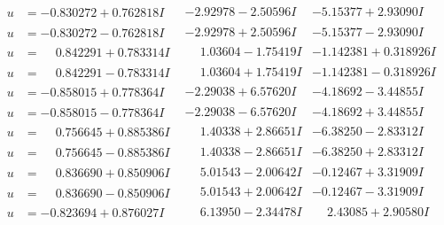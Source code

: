 \documentclass[1p]{elsarticle_modified}
\theoremstyle{definition}
\begin{document}
$$\begin{array}{c|c|c}
\begin{aligned}
u &= -0.830272 + 0.762818 I\end{aligned}
 & -2.92978 - 2.50596 I & -5.15377 + 2.93090 I \\ \hline\begin{aligned}
u &= -0.830272 - 0.762818 I\end{aligned}
 & -2.92978 + 2.50596 I & -5.15377 - 2.93090 I \\ \hline\begin{aligned}
u &= \phantom{-}0.842291 + 0.783314 I\end{aligned}
 & \phantom{-}1.03604 - 1.75419 I & -1.142381 + 0.318926 I \\ \hline\begin{aligned}
u &= \phantom{-}0.842291 - 0.783314 I\end{aligned}
 & \phantom{-}1.03604 + 1.75419 I & -1.142381 - 0.318926 I \\ \hline\begin{aligned}
u &= -0.858015 + 0.778364 I\end{aligned}
 & -2.29038 + 6.57620 I & -4.18692 - 3.44855 I \\ \hline\begin{aligned}
u &= -0.858015 - 0.778364 I\end{aligned}
 & -2.29038 - 6.57620 I & -4.18692 + 3.44855 I \\ \hline\begin{aligned}
u &= \phantom{-}0.756645 + 0.885386 I\end{aligned}
 & \phantom{-}1.40338 + 2.86651 I & -6.38250 - 2.83312 I \\ \hline\begin{aligned}
u &= \phantom{-}0.756645 - 0.885386 I\end{aligned}
 & \phantom{-}1.40338 - 2.86651 I & -6.38250 + 2.83312 I \\ \hline\begin{aligned}
u &= \phantom{-}0.836690 + 0.850906 I\end{aligned}
 & \phantom{-}5.01543 - 2.00642 I & -0.12467 + 3.31909 I \\ \hline\begin{aligned}
u &= \phantom{-}0.836690 - 0.850906 I\end{aligned}
 & \phantom{-}5.01543 + 2.00642 I & -0.12467 - 3.31909 I \\ \hline\begin{aligned}
u &= -0.823694 + 0.876027 I\end{aligned}
 & \phantom{-}6.13950 - 2.34478 I & \phantom{-}2.43085 + 2.90580 I \\ \hline\begin{aligned}

\end{aligned}
\end{array}$$
\end{document}
